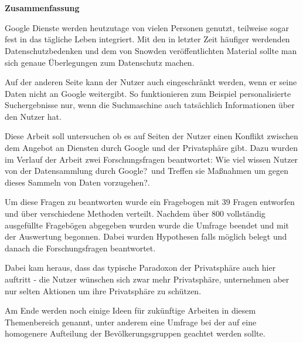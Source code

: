 %
% 

\chapter*{\ }


\begin{center}
	\begin{large}
		\textbf{Zusammenfassung}
	\end{large}
\end{center}
\vspace{0.75em}
Google Dienste werden heutzutage von vielen Personen genutzt, teilweise sogar fest in das tägliche Leben integriert. 
Mit den in letzter Zeit häufiger werdenden Datenschutzbedenken und dem von Snowden veröffentlichten Material sollte man sich genaue Überlegungen zum Datenschutz machen. 

Auf der anderen Seite kann der Nutzer auch eingeschränkt werden, wenn er seine Daten nicht an Google weitergibt. So funktionieren zum Beispiel personalisierte Suchergebnisse nur, wenn die Suchmaschine auch tatsächlich Informationen über den Nutzer hat.

Diese Arbeit soll untersuchen ob es auf Seiten der Nutzer einen Konflikt zwischen dem Angebot an Diensten durch Google und der Privatsphäre gibt. Dazu wurden im Verlauf der Arbeit zwei Forschungsfragen beantwortet: \glqq Wie viel wissen Nutzer von der Datensammlung durch Google?\grqq\ und \glqq Treffen sie Maßnahmen um gegen dieses Sammeln von Daten vorzugehen?\grqq .

Um diese Fragen zu beantworten wurde ein Fragebogen mit 39 Fragen entworfen und über verschiedene Methoden verteilt. Nachdem über 800 vollständig ausgefüllte Fragebögen abgegeben wurden wurde die Umfrage beendet und mit der Auswertung begonnen. Dabei wurden Hypothesen falls möglich belegt und danach die Forschungsfragen beantwortet. 

Dabei kam heraus, dass das typische Paradoxon der Privatsphäre auch hier auftritt - die Nutzer wünschen sich zwar mehr Privatsphäre, unternehmen aber nur selten Aktionen um ihre Privatsphäre zu schützen.

Am Ende werden noch einige Ideen für zukünftige Arbeiten in diesem Themenbereich genannt, unter anderem eine Umfrage bei der auf eine homogenere Aufteilung der Bevölkerungsgruppen geachtet werden sollte.

